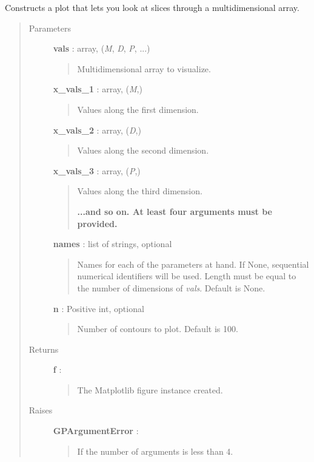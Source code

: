 \documentclass[letterpaper,10pt,english]{sphinxmanual}
\begin{document}

\begin{fulllineitems}
\label{gptools:gptools.gp_utils.slice_plot}
Constructs a plot that lets you look at slices through a multidimensional array.
\begin{quote}\begin{description}
\item[{Parameters}] \leavevmode
\textbf{vals} : array, (\emph{M}, \emph{D}, \emph{P}, ...)
\begin{quote}

Multidimensional array to visualize.
\end{quote}

\textbf{x\_vals\_1} : array, (\emph{M},)
\begin{quote}

Values along the first dimension.
\end{quote}

\textbf{x\_vals\_2} : array, (\emph{D},)
\begin{quote}

Values along the second dimension.
\end{quote}

\textbf{x\_vals\_3} : array, (\emph{P},)
\begin{quote}

Values along the third dimension.

\textbf{...and so on. At least four arguments must be provided.}
\end{quote}

\textbf{names} : list of strings, optional
\begin{quote}

Names for each of the parameters at hand. If None, sequential numerical
identifiers will be used. Length must be equal to the number of
dimensions of \emph{vals}. Default is None.
\end{quote}

\textbf{n} : Positive int, optional
\begin{quote}

Number of contours to plot. Default is 100.
\end{quote}

\item[{Returns}] \leavevmode
\textbf{f} : 
\begin{quote}

The Matplotlib figure instance created.
\end{quote}

\item[{Raises}] \leavevmode
\textbf{GPArgumentError} :
\begin{quote}

If the number of arguments is less than 4.
\end{quote}

\end{description}\end{quote}

\end{fulllineitems}
\end{document}
